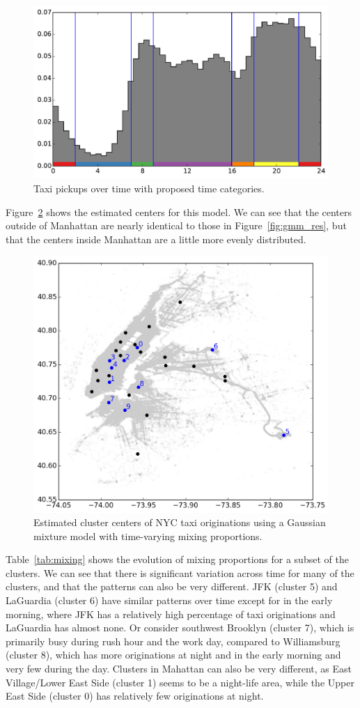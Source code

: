 \documentclass[12pt]{article}
\theoremstyle{definition}
\theoremstyle{algodesc}
\begin{document}
\begin{figure}[htb] \centering
  \includegraphics[width=0.8\linewidth]{./include/time.pdf}
  \caption{Taxi pickups over time with proposed time categories.}
  \label{fig:time}
\end{figure}

Figure~\ref{fig:gmm_cat_res} shows the estimated centers for this model. We can see that the centers outside of Manhattan are nearly identical to those in Figure~\ref{fig:gmm_res}, but that the centers inside Manhattan are a little more evenly distributed.

\begin{figure}[tb] \centering
  \includegraphics[width=0.7\linewidth]{./include/gmm_cat_res.png}
  \caption{Estimated cluster centers of NYC taxi originations using a Gaussian mixture model with time-varying mixing proportions.}
  \label{fig:gmm_cat_res}
\end{figure}

Table~\ref{tab:mixing} shows the evolution of mixing proportions for a subset of the clusters. We can see that there is significant variation across time for many of the clusters, and that the patterns can also be very different. JFK (cluster 5) and LaGuardia (cluster 6) have similar patterns over time except for in the early morning, where JFK has a relatively high percentage of taxi originations and LaGuardia has almost none. Or consider southwest Brooklyn (cluster 7), which is primarily busy during rush hour and the work day, compared to Williamsburg (cluster 8), which has more originations at night and in the early morning and very few during the day. Clusters in Mahattan can also be very different, as East Village/Lower East Side (cluster 1) seems to be a night-life area, while the Upper East Side (cluster 0) has relatively few originations at night.
\end{document}
